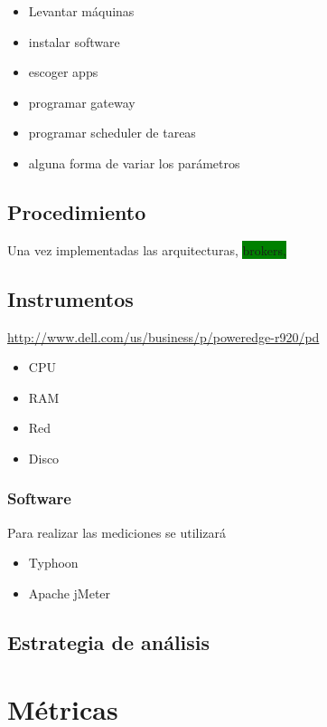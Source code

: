 \begin{itemize}
  \item Levantar máquinas
  \item instalar software
  \item escoger apps
  \item programar gateway
  \item programar scheduler de tareas
  \item alguna forma de variar los parámetros
\end{itemize}

\subsection{Procedimiento}
Una vez implementadas las arquitecturas, \colorbox{green}{brokers, }

\subsection{Instrumentos}

\url{http://www.dell.com/us/business/p/poweredge-r920/pd}
\begin{itemize}
  \item CPU
  \item RAM
  \item Red
  \item Disco
\end{itemize}

\subsubsection{Software}

Para realizar las mediciones se utilizará

\begin{itemize}
  \item Typhoon
  \item Apache jMeter
\end{itemize}

\subsection{Estrategia de análisis}

\subsection{}

\section{Métricas} %
\label{sec:métricas}

